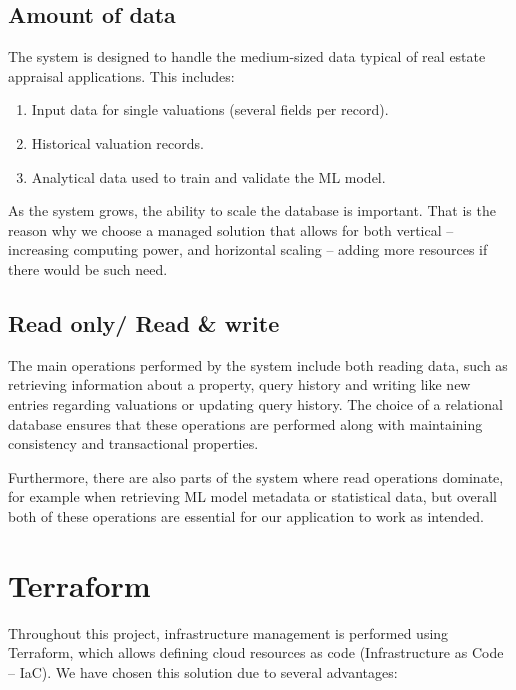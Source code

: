 \documentclass{article}
\begin{document}
\subsection{Amount of data}

The system is designed to handle the medium-sized data typical of real estate appraisal applications. This includes:

\begin{enumerate}
    \item Input data for single valuations (several fields per record).
    \item Historical valuation records.
    \item Analytical data used to train and validate the ML model.
\end{enumerate}

As the system grows, the ability to scale the database is important. That is the reason why we choose a managed solution that allows for both vertical  -- increasing computing power, and horizontal scaling -- adding more resources if there would be such need.


\subsection{Read only/ Read \& write}

The main operations performed by the system include both reading data, such as retrieving information about a property, query history and writing like new entries regarding valuations or updating query history. The choice of a relational database ensures that these operations are performed along with maintaining consistency and transactional properties.

Furthermore, there are also parts of the system where read operations dominate, for example when retrieving ML model metadata or statistical data, but overall both of these operations are essential for our application to work as intended. 


\section{Terraform}

Throughout this project, infrastructure management is performed using Terraform, which allows defining cloud resources as code (Infrastructure as Code – IaC). We have chosen this solution due to several advantages:
\end{document}
